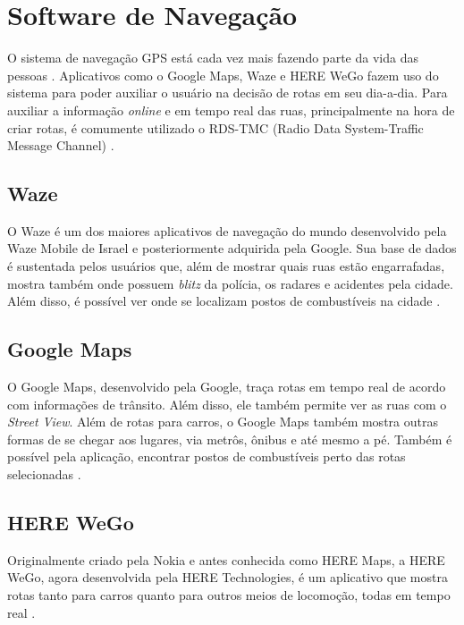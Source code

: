 \section{Software de Navegação}

O sistema de navegação GPS está cada vez mais fazendo parte da vida das pessoas \cite{gps-1}. Aplicativos como o Google Maps, Waze e HERE WeGo fazem uso do sistema para poder auxiliar o usuário na decisão de rotas em seu dia-a-dia. Para auxiliar a informação \textit{online} e em tempo real das ruas, principalmente na hora de criar rotas, é comumente utilizado o RDS-TMC (Radio Data System-Traffic Message Channel) \cite{rds-tmc}.

\subsection{Waze}
O Waze é um dos maiores aplicativos de navegação do mundo desenvolvido pela Waze Mobile de Israel e posteriormente adquirida pela Google. Sua base de dados é sustentada pelos usuários que, além de mostrar quais ruas estão engarrafadas, mostra também onde possuem \textit{blitz} da polícia, os radares e acidentes pela cidade. Além disso, é possível ver onde se localizam postos de combustíveis na cidade \cite{waze}.

\subsection{Google Maps}
O Google Maps, desenvolvido pela Google, traça rotas em tempo real de acordo com informações de trânsito. Além disso, ele também permite ver as ruas com o \textit{Street View}. Além de rotas para carros, o Google Maps também mostra outras formas de se chegar aos lugares, via metrôs, ônibus e até mesmo a pé. Também é possível pela aplicação, encontrar postos de combustíveis perto das rotas selecionadas \cite{google-maps}.

\subsection{HERE WeGo}
Originalmente criado pela Nokia e antes conhecida como HERE Maps, a HERE WeGo, agora desenvolvida pela HERE Technologies, é um aplicativo que mostra rotas tanto para carros quanto para outros meios de locomoção, todas em tempo real \cite{herewego}.
